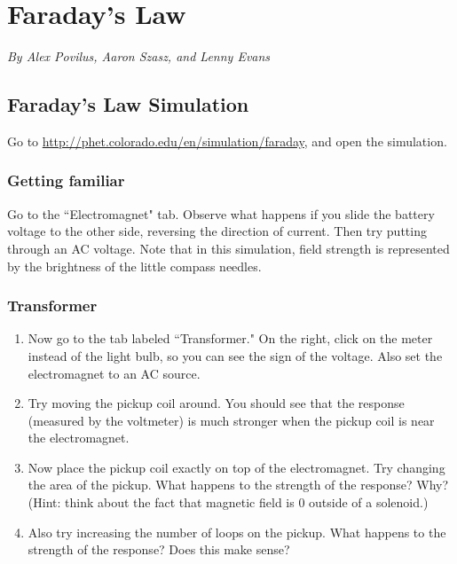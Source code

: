 \documentclass[12pt]{book}
\begin{document}
\pagebreak

\section{Faraday's Law}

{\it By Alex Povilus, Aaron Szasz, and Lenny Evans}

\subsection{Faraday's Law Simulation}

Go to \url{http://phet.colorado.edu/en/simulation/faraday}, and open the simulation. \\

\subsubsection{Getting familiar}

Go to the ``Electromagnet" tab. Observe what happens if you slide the battery voltage to the other
side, reversing the direction of current. Then try putting through an AC voltage. Note that in this
simulation, field strength is represented by the brightness of the little compass needles.\\

\subsubsection{ Transformer}
\begin{enumerate}
 \item Now go to the tab labeled ``Transformer." On the right, click on the meter instead of the
light bulb, so you can see the sign of the voltage. Also set the electromagnet to an AC source.

\item Try moving the pickup coil around. You should see that the response (measured by the
voltmeter) is much stronger when the pickup coil is near the electromagnet.

\item Now place the pickup coil exactly on top of the electromagnet. Try changing the area of the
pickup. What happens to the strength of the response? Why? (Hint: think about the fact
that magnetic field is 0 outside of a solenoid.)

\item Also try increasing the number of loops on the pickup. What happens to the strength of the
response? Does this make sense?\\
\end{enumerate}
\end{document}
